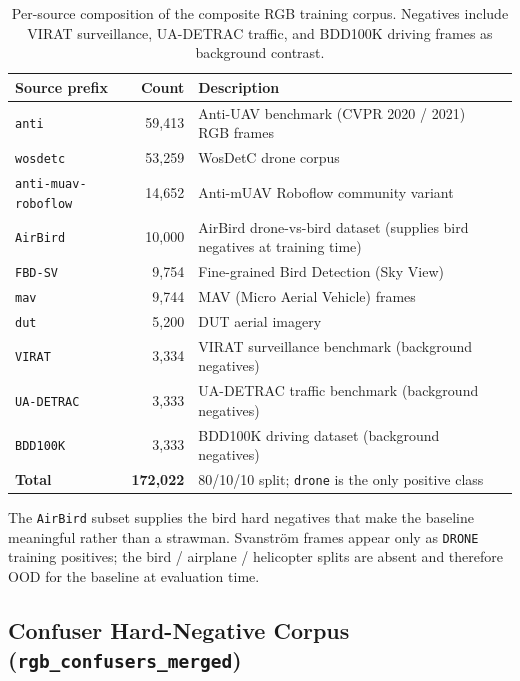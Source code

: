 \begin{table}[htbp]
    \centering
    \caption{Per-source composition of the composite RGB training corpus. Negatives include VIRAT surveillance, UA-DETRAC traffic, and BDD100K driving frames as background contrast.}
    \label{tab:ds_rgb_components}
    \begin{tabular}{lrp{7.2cm}}
        \toprule
        Source prefix & Count & Description \\
        \midrule
        \texttt{anti}                 & 59{,}413 & Anti-UAV benchmark (CVPR 2020 / 2021)~\cite{jiang2021antiuav} RGB frames \\
        \texttt{wosdetc}              & 53{,}259 & WosDetC drone corpus \\
        \texttt{anti-muav-roboflow}   & 14{,}652 & Anti-mUAV Roboflow community variant \\
        \texttt{AirBird}              & 10{,}000 & AirBird drone-vs-bird dataset (supplies bird negatives at training time) \\
        \texttt{FBD-SV}               &  9{,}754 & Fine-grained Bird Detection (Sky View) \\
        \texttt{mav}                  &  9{,}744 & MAV (Micro Aerial Vehicle) frames \\
        \texttt{dut}                  &  5{,}200 & DUT aerial imagery \\
        \texttt{VIRAT}                &  3{,}334 & VIRAT surveillance benchmark (background negatives) \\
        \texttt{UA-DETRAC}            &  3{,}333 & UA-DETRAC traffic benchmark (background negatives) \\
        \texttt{BDD100K}              &  3{,}333 & BDD100K driving dataset (background negatives) \\
        \midrule
        \textbf{Total}                & \textbf{172{,}022} & 80/10/10 split; \texttt{drone} is the only positive class \\
        \bottomrule
    \end{tabular}
\end{table}

The \texttt{AirBird} subset supplies the bird hard negatives that make the baseline meaningful rather than a strawman. Svanstr\"om frames appear only as \texttt{DRONE} training positives; the bird / airplane / helicopter splits are absent and therefore OOD for the baseline at evaluation time.

\subsection{Confuser Hard-Negative Corpus (\texttt{rgb\_confusers\_merged})}
\label{sec:ds_confusers}


